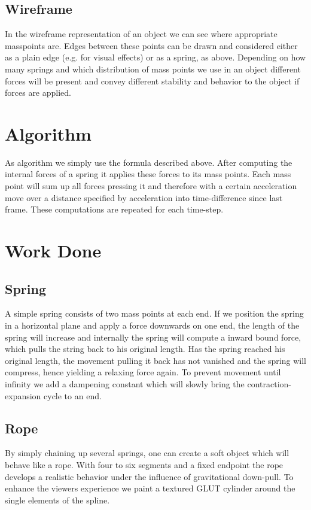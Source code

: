 \documentclass[11pt]{article}
\begin{document}
\subsection{Wireframe}
In the wireframe representation of an object we can see where appropriate masspoints are. Edges between these points can be drawn and considered either as a plain edge (e.g. for visual effects) or as a spring, as above. Depending on how many springs and which distribution of mass points we use in an object different forces will be present and convey different stability and behavior to the object if forces are applied.
%
%
%
\section{Algorithm}
As algorithm we simply use the formula described above. After computing the internal forces of a spring it applies these forces to its mass points. Each mass point will sum up all forces pressing it and therefore with a certain acceleration move over a distance specified by acceleration into time-difference since last frame. These computations are repeated for each time-step.

\section{Work Done}
\subsection{Spring}
A simple spring consists of two mass points at each end. If we position the spring in a horizontal plane and apply a force downwards on one end, the length of the spring will increase and internally the spring will compute a inward bound force, which pulls the string back to his original length. Has the spring reached his original length, the movement pulling it back has not vanished and the spring will compress, hence yielding a relaxing force again. To prevent movement until infinity we add a dampening constant which will slowly bring the contraction-expansion cycle to an end.
\subsection{Rope}
By simply chaining up several springs, one can create a soft object which will behave like a rope. With four to six segments and a fixed endpoint the rope develops a realistic behavior under the influence of gravitational down-pull. To enhance the viewers experience we paint a textured GLUT cylinder around the single elements of the spline.
\end{document}
